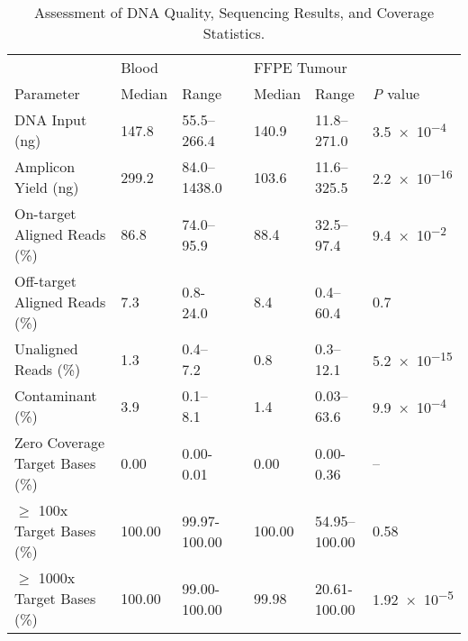 \documentclass{bmcart}
\begin{document}
\begin{backmatter}
\begin{table}[!h]
\caption{Assessment of DNA Quality, Sequencing Results, and Coverage Statistics.}\label{metrics}
      \begin{tabular}{lllllll}
        \hline
				\multicolumn{1}{l}{ }
				&
				\multicolumn{2}{l}{Blood}
				&&
				\multicolumn{2}{l}{FFPE Tumour}
				&
				\multicolumn{1}{l}{ } \\
				\cline{2-3}\cline{5-6}
        Parameter & Median & Range && Median & Range & \textit{P} value \\ \hline
				DNA Input (ng) & 147.8 & 55.5--266.4 && 140.9 & 11.8--271.0 & \num{3.5e-4} \\
				Amplicon Yield (ng) & 299.2 & 84.0--1438.0 && 103.6 & 11.6--325.5 & \num{2.2e-16} \\
				On-target Aligned Reads (\%) & 86.8 & 74.0--95.9 && 88.4 & 32.5--97.4 & \num{9.4e-2} \\
				Off-target Aligned Reads (\%) & 7.3 & 0.8-24.0 && 8.4 & 0.4--60.4 & \num{0.7} \\
				Unaligned Reads (\%) & 1.3 & 0.4--7.2 && 0.8 & 0.3--12.1 & \num{5.2e-15} \\
				Contaminant (\%) & 3.9 & 0.1--8.1 && 1.4 & 0.03--63.6 &
				\num{9.9e-4} \\
				Zero Coverage Target Bases (\%) & 0.00 & 0.00-0.01 && 0.00 & 0.00-0.36 &
				-- \\
				$\geq$ 100x Target Bases (\%) & 100.00 & 99.97-100.00 && 100.00 & 54.95--100.00 &
				\num{0.58} \\
				$\geq$ 1000x Target Bases (\%) & 100.00 & 99.00-100.00 && 99.98 & 20.61-100.00 & \num{1.92e-5} \\
				\hline
      \end{tabular} \\
\end{table}


\end{backmatter}
\end{document}

